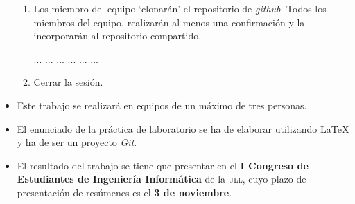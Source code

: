 \documentclass[spanish,a4paper,11pt]{article}
\begin{document}
\begin{itemize}
\begin{enumerate}
\item
Los miembro del equipo `clonarán' el repositorio de \textit{github}.
%
Todos los miembros del equipo, realizarán al menos una confirmación y la incorporarán al repositorio compartido.

... ... ... ... ... ... 

\item
 Cerrar la sesión.

\end{enumerate}


\item
Este trabajo se realizará en equipos de un máximo de tres personas.

\item
El enunciado de la práctica de laboratorio se ha de elaborar utilizando \LaTeX{} y 
ha de ser un proyecto \textit{Git}.

\item
El resultado del trabajo se tiene que presentar en el
\textbf{I Congreso de Estudiantes de Ingeniería Informática}
de la \textsc{ull}, cuyo plazo de presentación de resúmenes es el \textbf{3 de noviembre}.

\end{itemize}
\end{document}

